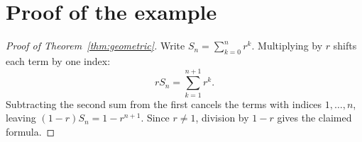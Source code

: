 \section{Proof of the example}\label{sec:appendix}
\begin{proof}[Proof of Theorem~\ref{thm:geometric}]
Write $S_n=\sum_{k=0}^{n}r^k$. Multiplying by $r$ shifts each term by one index:
\[
rS_n=\sum_{k=1}^{n+1}r^k.
\]
Subtracting the second sum from the first cancels the terms with indices
$1,\ldots,n$, leaving $(1-r)S_n=1-r^{n+1}$. Since $r\ne1$, division by $1-r$
gives the claimed formula.
\end{proof}
